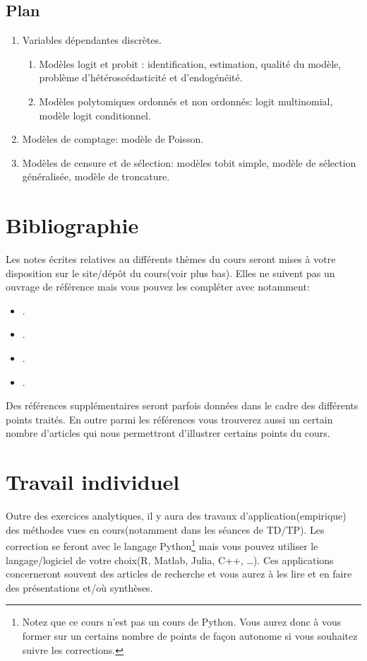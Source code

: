  \subsection*{Plan}

\begin{enumerate}
\item Variables dépendantes discrètes.
\begin{enumerate}
\item Modèles logit et probit : identification, estimation, 
qualité du modèle, problème d'hétéroscédasticité et d'endogénéité.
\item Modèles polytomiques ordonnés et non ordonnés: 
logit multinomial, modèle logit conditionnel.
\end{enumerate}
\item Modèles de comptage: modèle de Poisson.
\item Modèles de censure et de sélection: modèles tobit simple, 
modèle de sélection généralisée, 
modèle de troncature.
\end{enumerate}


\section{Bibliographie}

Les notes écrites relatives au différents thèmes du cours seront mises à votre disposition sur le site/dépôt du cours(voir plus bas).
Elles ne suivent pas un ouvrage de référence mais vous pouvez les compléter avec  notamment:
\begin{itemize}[label = -]
\item \cite{Amemiya1985}.
\item \cite{ap2009}.
\item \cite{Hansen2017}.
\item \cite{Wooldridge2010}.
\end{itemize}
Des références supplémentaires seront parfois données dans le cadre des différents points traités.
En outre parmi les références vous trouverez aussi un certain nombre d'articles qui nous 
permettront d'illustrer certains points du cours. 


\section{Travail individuel}
Outre des exercices analytiques, il y aura des travaux d'application(empirique) des méthodes 
vues en cours(notamment dans les séances de TD/TP). Les correction se feront avec le langage 
Python\footnote{Notez que ce cours n'est pas un cours de Python. Vous aurez donc à vous former sur un certains nombre de points 
de façon autonome si vous souhaitez suivre les corrections.} mais vous pouvez utiliser 
le langage/logiciel de votre choix(R, Matlab, Julia, C++, \ldots). Ces applications concerneront souvent 
des articles de recherche et vous aurez à les lire et en faire des présentations et/où synthèses.

